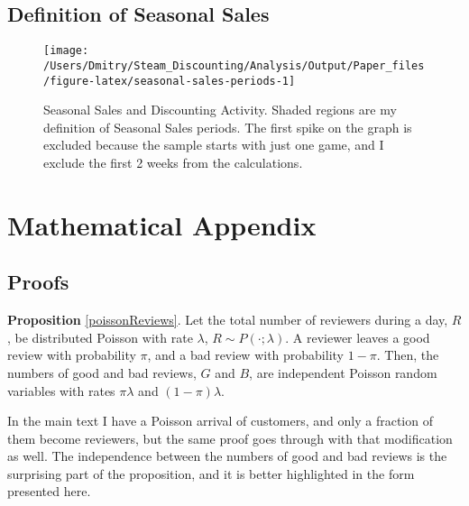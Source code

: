 \documentclass[12pt,pagebackref]{article}
\begin{document}
\newpage

\hypertarget{definition-of-seasonal-sales}{%
\subsection{Definition of Seasonal
Sales}\label{definition-of-seasonal-sales}}

\begin{figure}[h]

{\centering \texttt{[image: /Users/Dmitry/Steam\_Discounting/Analysis/Output/Paper\_files/figure-latex/seasonal-sales-periods-1]} 

}

\caption{\label{seasonalSalesPeriods} Seasonal Sales and Discounting Activity. Shaded regions are my definition of Seasonal Sales periods. The first spike on the graph is excluded because the sample starts with just one game, and I exclude the first 2 weeks from the calculations.}\label{fig:seasonal-sales-periods}
\end{figure}

\newpage

\hypertarget{mathematical-appendix}{%
\section{Mathematical Appendix}\label{mathematical-appendix}}

\hypertarget{proofs}{%
\subsection{Proofs}\label{proofs}}

\textbf{Proposition} \ref{poissonReviews}. Let the total number of
reviewers during a day, \(R\), be distributed Poisson with rate
\(\lambda\), \(R\sim P(\cdot; \lambda)\). A reviewer leaves a good
review with probability \(\pi\), and a bad review with probability
\(1-\pi\). Then, the numbers of good and bad reviews, \(G\) and \(B\),
are independent Poisson random variables with rates \(\pi\lambda\) and
\((1-\pi)\lambda\).

In the main text I have a Poisson arrival of customers, and only a
fraction of them become reviewers, but the same proof goes through with
that modification as well. The independence between the numbers of good
and bad reviews is the surprising part of the proposition, and it is
better highlighted in the form presented here.

\vspace{1em}
\end{document}
